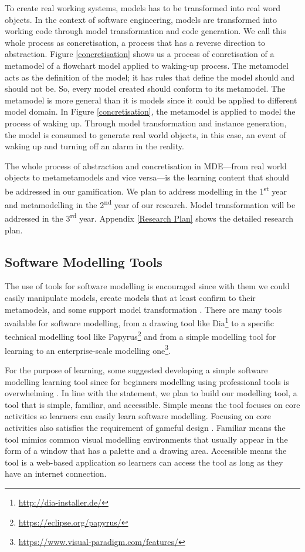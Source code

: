 \documentclass[12pt, a4paper]{report}
\begin{document}
To create real working systems, models has to be transformed into real word objects. In the context of software engineering, models are transformed into working code through model transformation and code generation. We call this whole process as concretisation, a process that has a reverse direction to abstraction. Figure \ref{concretisation} shows us a process of conretisation of a metamodel of a flowchart model applied to waking-up process. The metamodel acts as the definition of the model; it has rules that define the model should and should not be. So, every model created should conform to its metamodel. The metamodel is more general than it is models since it could be applied to different model domain. In Figure \ref{concretisation}, the metamodel is applied to model the process of waking up. Through model transformation and instance generation, the model is consumed to generate real world objects, in this case, an event of waking up and turning off an alarm in the reality.   

The whole process of abstraction and concretisation in MDE---from real world objects to metametamodels and vice versa---is the learning content that should be addressed in our gamification. We plan to address modelling in the 1\textsuperscript{st} year and metamodelling in the 2\textsuperscript{nd} year of our research. Model transformation will be addressed in the 3\textsuperscript{rd} year. Appendix \ref{Research Plan} shows the detailed research plan.   
 
\subsection{Software Modelling Tools}
The use of tools for software modelling is encouraged since with them we could easily manipulate models, create models that at least confirm to their metamodels, and some support model transformation \cite{brambilla2012model}. There are many tools available for software modelling, from a drawing tool like Dia\footnote{\url{http://dia-installer.de/}} to a specific technical modelling tool like Papyrus\footnote{\url{https://eclipse.org/papyrus/}} and from a simple modelling tool for learning \cite{dranidis2015learning} to an enterprise-scale modelling one\footnote{\url{https://www.visual-paradigm.com/features/}}. 

For the purpose of learning, some suggested developing a simple software modelling learning tool since for beginners modelling using professional tools is overwhelming \cite{dranidis2015learning, Akayama2013}. In line with the statement, we plan to build our modelling tool, a tool that is simple, familiar, and accessible. Simple means the tool focuses on core activities so learners can easily learn software modelling. Focusing on core activities also satisfies the requirement of gameful design \cite{deterding2011game}. Familiar means the tool mimics common visual modelling environments that usually appear in the form of a window that has a palette and a drawing area. Accessible means the tool is a web-based application so learners can access the tool as long as they have an internet connection.      
\end{document}
